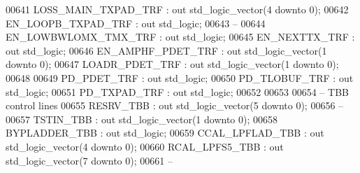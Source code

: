 \begin{DoxyCode}
00641         LOSS\_MAIN\_TXPAD\_TRF     : \textcolor{keywordflow}{out} \textcolor{comment}{std\_logic\_vector}(\textcolor{vhdllogic}{}\textcolor{vhdllogic}{4} \textcolor{keywordflow}{downto} \textcolor{vhdllogic}{}\textcolor{vhdllogic}{0});
00642         EN\_LOOPB\_TXPAD\_TRF      : \textcolor{keywordflow}{out} \textcolor{comment}{std\_logic};
00643 \textcolor{keyword}{        --}
00644         EN\_LOWBWLOMX\_TMX\_TRF    : \textcolor{keywordflow}{out} \textcolor{comment}{std\_logic};
00645         EN\_NEXTTX\_TRF                   : \textcolor{keywordflow}{out} \textcolor{comment}{std\_logic};
00646         EN\_AMPHF\_PDET\_TRF           : \textcolor{keywordflow}{out} \textcolor{comment}{std\_logic\_vector}(\textcolor{vhdllogic}{}\textcolor{vhdllogic}{1} \textcolor{keywordflow}{downto} \textcolor{vhdllogic}{}\textcolor{vhdllogic}{0});
00647         LOADR\_PDET\_TRF              : \textcolor{keywordflow}{out} \textcolor{comment}{std\_logic\_vector}(\textcolor{vhdllogic}{}\textcolor{vhdllogic}{1} \textcolor{keywordflow}{downto} \textcolor{vhdllogic}{}\textcolor{vhdllogic}{0});
00648 
00649         PD\_PDET\_TRF                     : \textcolor{keywordflow}{out} \textcolor{comment}{std\_logic};
00650         PD\_TLOBUF\_TRF                   : \textcolor{keywordflow}{out} \textcolor{comment}{std\_logic};
00651         PD\_TXPAD\_TRF                    : \textcolor{keywordflow}{out} \textcolor{comment}{std\_logic};
00652 
00653 
00654 \textcolor{keyword}{        -- TBB control lines}
00655         RESRV\_TBB   : \textcolor{keywordflow}{out} \textcolor{comment}{std\_logic\_vector}(\textcolor{vhdllogic}{}\textcolor{vhdllogic}{5} \textcolor{keywordflow}{downto} \textcolor{vhdllogic}{}\textcolor{vhdllogic}{0});
00656 \textcolor{keyword}{        --}
00657         TSTIN\_TBB   : \textcolor{keywordflow}{out} \textcolor{comment}{std\_logic\_vector}(\textcolor{vhdllogic}{}\textcolor{vhdllogic}{1} \textcolor{keywordflow}{downto} \textcolor{vhdllogic}{}\textcolor{vhdllogic}{0});
00658         BYPLADDER\_TBB       : \textcolor{keywordflow}{out} \textcolor{comment}{std\_logic};
00659         CCAL\_LPFLAD\_TBB : \textcolor{keywordflow}{out} \textcolor{comment}{std\_logic\_vector}(\textcolor{vhdllogic}{}\textcolor{vhdllogic}{4} \textcolor{keywordflow}{downto} \textcolor{vhdllogic}{}\textcolor{vhdllogic}{0});
00660         RCAL\_LPFS5\_TBB  : \textcolor{keywordflow}{out} \textcolor{comment}{std\_logic\_vector}(\textcolor{vhdllogic}{}\textcolor{vhdllogic}{7} \textcolor{keywordflow}{downto} \textcolor{vhdllogic}{}\textcolor{vhdllogic}{0});
00661 \textcolor{keyword}{        --}

\end{DoxyCode}
